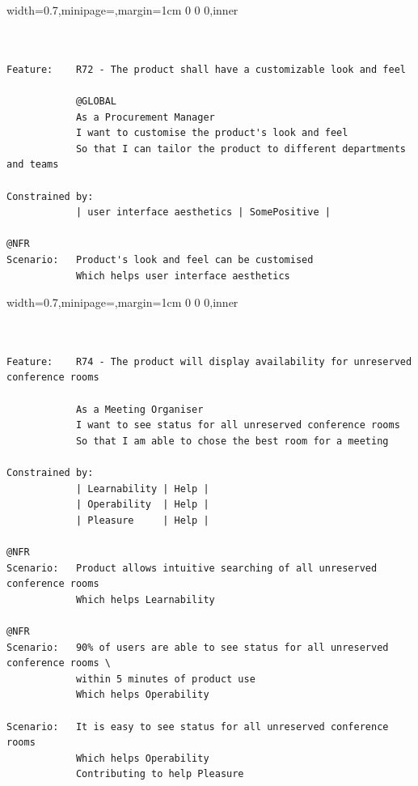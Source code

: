 \documentclass[dissertation,final]{softeng}
\newenvironment{featurecode}[1]
{ \lrbox\featurebox \begin{adjustbox}{width=#1\textwidth,minipage=\textwidth,margin=1cm 0 0 0,inner} }
{ \end{adjustbox}\endlrbox}
\newenvironment{featurelist}[2]
{
\newcommand{\setcaption}{\caption{#1}}
\newcommand{\setlabel}{\label{#2}}
}
{\begin{listing}[h!]\centering\usebox\featurebox\setcaption\setlabel\end{listing}}
\begin{document}
\begin{appendices}
\begin{featurelist}{R72 -- The product shall have a customizable look and feel}{lst:feature_r72}
\begin{featurecode}{0.7}
\begin{verbatim}


Feature:    R72 - The product shall have a customizable look and feel
			
            @GLOBAL
            As a Procurement Manager
            I want to customise the product's look and feel
            So that I can tailor the product to different departments and teams
	
Constrained by:
            | user interface aesthetics | SomePositive |

@NFR
Scenario:   Product's look and feel can be customised
            Which helps user interface aesthetics
\end{verbatim}
\end{featurecode}
\end{featurelist}

\begin{featurelist}{R74 -- The product will display availability for unreserved conference rooms}{lst:feature_r74}
\begin{featurecode}{0.7}
\begin{verbatim}


Feature:    R74 - The product will display availability for unreserved conference rooms

            As a Meeting Organiser
            I want to see status for all unreserved conference rooms
            So that I am able to chose the best room for a meeting
	
Constrained by:
            | Learnability | Help |
            | Operability  | Help |
            | Pleasure     | Help |			

@NFR	
Scenario:   Product allows intuitive searching of all unreserved conference rooms
            Which helps Learnability

@NFR	
Scenario:   90% of users are able to see status for all unreserved conference rooms \
            within 5 minutes of product use
            Which helps Operability
	
Scenario:   It is easy to see status for all unreserved conference rooms
            Which helps Operability
            Contributing to help Pleasure
\end{verbatim}
\end{featurecode}
\end{featurelist}


\end{appendices}
\end{document}
